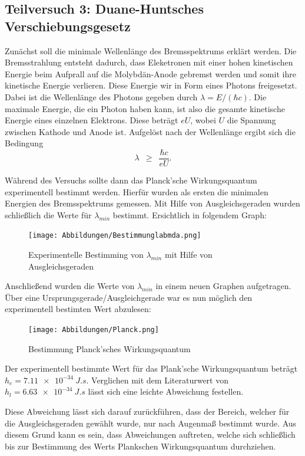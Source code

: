 \documentclass{article}
\newcommand{\widespace}{\enspace}
\newcommand{\widegeq}{\widespace \geq \widespace}
\begin{document}
\newpage


\subsection{Teilversuch 3: Duane-Huntsches Verschiebungsgesetz}

Zunächst soll die minimale Wellenlänge des Bremsspektrums erklärt werden.
Die Bremsstrahlung entsteht dadurch, dass Eleketronen mit einer hohen kinetischen
Energie beim Aufprall auf die Molybdän-Anode gebremst werden und somit ihre
kinetische Energie verlieren. Diese Energie wir in Form eines Photons freigesetzt.
Dabei ist die Wellenlänge des Photons gegeben durch $\lambda = E / (\hbar c)$.
Die maximale Energie, die ein Photon haben kann, ist also die gesamte kinetische
Energie eines einzelnen Elektrons. Diese beträgt $eU$, wobei $U$ die Spannung
zwischen Kathode und Anode ist.
Aufgelöst nach der Wellenlänge ergibt sich die Bedingung
\[
    \lambda \widegeq \frac{\hbar c}{e U}.
\]

Während des Versuchs sollte dann das Planck'sche Wirkungsquantum experimentell bestimmt werden. Hierfür wurden als ersten die minimalen Energien des Bremsspektrums gemessen. Mit Hilfe von Ausgleichsgeraden wurden schließlich die Werte für $\lambda_{min}$ bestimmt. Ersichtlich in folgendem Graph:

\begin{figure}[H]
    \centering
    \texttt{[image: Abbildungen/Bestimmunglabmda.png]}
    \caption{Experimentelle Bestimming von $\lambda_{min}$ mit Hilfe von Ausgleichsgeraden}
\end{figure}

Anschließend wurden die Werte von $\lambda_{min}$ in einem neuen Graphen aufgetragen. Über eine Ursprungsgerade/Ausgleichgerade war es nun möglich den experimentell bestimten Wert abzulesen:

\begin{figure}[H]
    \centering
    \texttt{[image: Abbildungen/Planck.png]}
    \caption{Bestimmung Planck'sches Wirkungsquantum}
\end{figure}

Der experimentell bestimmte Wert für das Plank'sche Wirkungsquantum beträgt $h_e=\qty{7.11e-34}{J.s}$. Verglichen mit dem Literaturwert von $h_l=\qty{6.63e-34}{J.s}$ lässt sich eine leichte Abweichung festellen.

Diese Abweichung lässt sich darauf zurückführen, dass der Bereich, welcher für die Ausgleichsgeraden gewählt wurde, nur nach Augenmaß bestimmt wurde. Aus diesem Grund kann es sein, dass Abweichungen auftreten, welche sich schließlich bis zur Bestimmung des Werts Plankschen Wirkungsquantum durchziehen.
\end{document}
